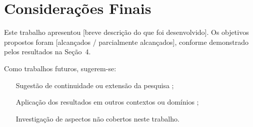 \section{Considerações Finais}


Este trabalho apresentou [breve descrição do que foi desenvolvido].
Os objetivos propostos foram [alcançados / parcialmente alcançados], conforme
demonstrado pelos resultados na Seção~4.

Como trabalhos futuros, sugerem-se:

\begin{itemize}
    \item [Sugestão de continuidade ou extensão da pesquisa];
    \item [Aplicação dos resultados em outros contextos ou domínios];
    \item [Investigação de aspectos não cobertos neste trabalho.]
\end{itemize}